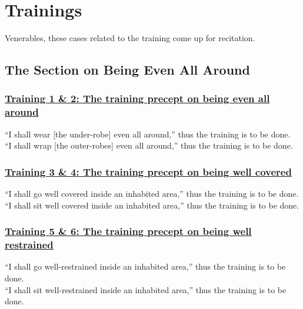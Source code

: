 
\section{Trainings}
\label{trainings}

\begin{intro}
	Venerables, these cases related to the training come up for recitation.
\end{intro}

\setsubsecheadstyle{\subsectionFmt}
\subsection{The Section on Being Even All Around}
\label{trainings-vagga1}

\subsubsection*{\hyperref[sekh1-2]{Training 1 \& 2: The training precept on being even all around}}
\label{training1-2}
``I shall wear [the under-robe] even all around,'' thus the training is to be done.\\
``I shall wrap [the outer-robes] even all around,'' thus the training is to be done.



\subsubsection*{\hyperref[sekh3-4]{Training 3 \& 4: The training precept on being well covered}}
\label{training3-4}
``I shall go well covered inside an inhabited area,'' thus the training is to be done.\\
``I shall sit well covered inside an inhabited area,'' thus the training is to be done.



\subsubsection*{\hyperref[sekh5-6]{Training 5 \& 6: The training precept on being well restrained}}
\label{training5-6}
``I shall go well-restrained inside an inhabited area,'' thus the training is to be done.\\
``I shall sit well-restrained inside an inhabited area,'' thus the training is to be done.



